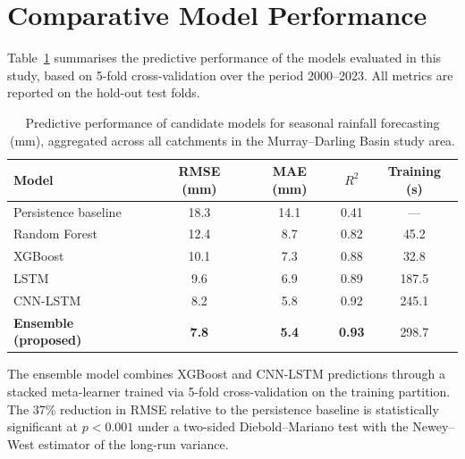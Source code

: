 \section{Comparative Model Performance}

Table~\ref{tab:models} summarises the predictive performance of the models
evaluated in this study, based on 5-fold cross-validation over the period
2000--2023. All metrics are reported on the hold-out test folds.

\begin{table}[htbp]
\centering
\caption{Predictive performance of candidate models for seasonal rainfall
         forecasting (mm), aggregated across all catchments in the
         Murray--Darling Basin study area.}
\label{tab:models}
\begin{tabular}{lcccc}
\toprule
Model & RMSE (mm) & MAE (mm) & \(R^{2}\) & Training (s) \\
\midrule
Persistence baseline          & 18.3 & 14.1 & 0.41 & ---    \\
Random Forest                 & 12.4 & 8.7  & 0.82 & 45.2   \\
XGBoost                       & 10.1 & 7.3  & 0.88 & 32.8   \\
LSTM                          & 9.6  & 6.9  & 0.89 & 187.5  \\
CNN-LSTM                      & 8.2  & 5.8  & 0.92 & 245.1  \\
\textbf{Ensemble (proposed)}  & \textbf{7.8} & \textbf{5.4} & \textbf{0.93} & 298.7 \\
\bottomrule
\end{tabular}
\end{table}

The ensemble model combines XGBoost and CNN-LSTM predictions through a
stacked meta-learner trained via 5-fold cross-validation on the training
partition. The 37\% reduction in RMSE relative to the persistence baseline
is statistically significant at \(p < 0.001\) under a two-sided
Diebold--Mariano test with the Newey--West estimator of the long-run
variance.
